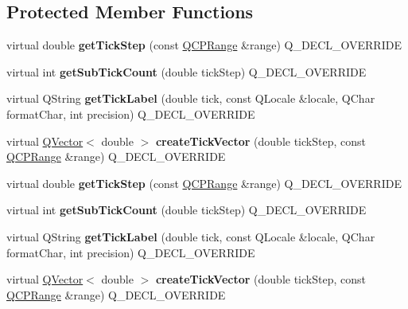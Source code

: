 \subsection*{Protected Member Functions}
\begin{DoxyCompactItemize}
\item 
\mbox{\label{class_q_c_p_axis_ticker_date_time_a0560c14a3f87bb99ab136aca8321b32a}} 
virtual double {\bfseries get\+Tick\+Step} (const \hyperlink{class_q_c_p_range}{Q\+C\+P\+Range} \&range) Q\+\_\+\+D\+E\+C\+L\+\_\+\+O\+V\+E\+R\+R\+I\+DE
\item 
\mbox{\label{class_q_c_p_axis_ticker_date_time_a78dece0d51426a3c310528d413e09193}} 
virtual int {\bfseries get\+Sub\+Tick\+Count} (double tick\+Step) Q\+\_\+\+D\+E\+C\+L\+\_\+\+O\+V\+E\+R\+R\+I\+DE
\item 
\mbox{\label{class_q_c_p_axis_ticker_date_time_a4dc6a03f7ea5c619477528a683ed5c18}} 
virtual Q\+String {\bfseries get\+Tick\+Label} (double tick, const Q\+Locale \&locale, Q\+Char format\+Char, int precision) Q\+\_\+\+D\+E\+C\+L\+\_\+\+O\+V\+E\+R\+R\+I\+DE
\item 
\mbox{\label{class_q_c_p_axis_ticker_date_time_a44c2c09a303d281801b69226e243047d}} 
virtual \hyperlink{class_q_vector}{Q\+Vector}$<$ double $>$ {\bfseries create\+Tick\+Vector} (double tick\+Step, const \hyperlink{class_q_c_p_range}{Q\+C\+P\+Range} \&range) Q\+\_\+\+D\+E\+C\+L\+\_\+\+O\+V\+E\+R\+R\+I\+DE
\item 
\mbox{\label{class_q_c_p_axis_ticker_date_time_ab6f6570d12c875dd3c57d71d399fff0b}} 
virtual double {\bfseries get\+Tick\+Step} (const \hyperlink{class_q_c_p_range}{Q\+C\+P\+Range} \&range) Q\+\_\+\+D\+E\+C\+L\+\_\+\+O\+V\+E\+R\+R\+I\+DE
\item 
\mbox{\label{class_q_c_p_axis_ticker_date_time_a0bd73692b3e7636e9fe6e00645dfc4ed}} 
virtual int {\bfseries get\+Sub\+Tick\+Count} (double tick\+Step) Q\+\_\+\+D\+E\+C\+L\+\_\+\+O\+V\+E\+R\+R\+I\+DE
\item 
\mbox{\label{class_q_c_p_axis_ticker_date_time_a8869afd045012689cd8a541af7e5178e}} 
virtual Q\+String {\bfseries get\+Tick\+Label} (double tick, const Q\+Locale \&locale, Q\+Char format\+Char, int precision) Q\+\_\+\+D\+E\+C\+L\+\_\+\+O\+V\+E\+R\+R\+I\+DE
\item 
\mbox{\label{class_q_c_p_axis_ticker_date_time_a4dfccc4115da212812ef22e5662171d6}} 
virtual \hyperlink{class_q_vector}{Q\+Vector}$<$ double $>$ {\bfseries create\+Tick\+Vector} (double tick\+Step, const \hyperlink{class_q_c_p_range}{Q\+C\+P\+Range} \&range) Q\+\_\+\+D\+E\+C\+L\+\_\+\+O\+V\+E\+R\+R\+I\+DE
\end{DoxyCompactItemize}
